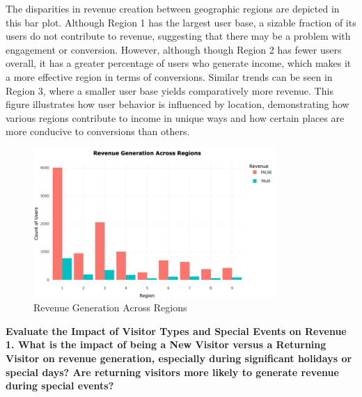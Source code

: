 \documentclass[12pt]{article}
\begin{document}
\FloatBarrier
The disparities in revenue creation between geographic regions are depicted in this bar plot. Although Region 1 has the largest user base, a sizable fraction of its users do not contribute to revenue, suggesting that there may be a problem with engagement or conversion. However, although though Region 2 has fewer users overall, it has a greater percentage of users who generate income, which makes it a more effective region in terms of conversions. Similar trends can be seen in Region 3, where a smaller user base yields comparatively more revenue. This figure illustrates how user behavior is influenced by location, demonstrating how various regions contribute to income in unique ways and how certain places are more conducive to conversions than others.

\begin{figure}[h]
    \centering
    \includegraphics[width=0.82\textwidth]{Revenue Generation Across Regions.png}  
    \caption{Revenue Generation Across Regions}
\end{figure}
\vspace{0.5cm}

\newpage

\textbf{Evaluate the Impact of Visitor Types and Special Events on Revenue}\\

\textbf{1. What is the impact of being a New Visitor versus a Returning Visitor on revenue generation, especially during significant holidays or special days? Are returning visitors more likely to generate revenue during special events?} \\[5pt] %
\end{document}
